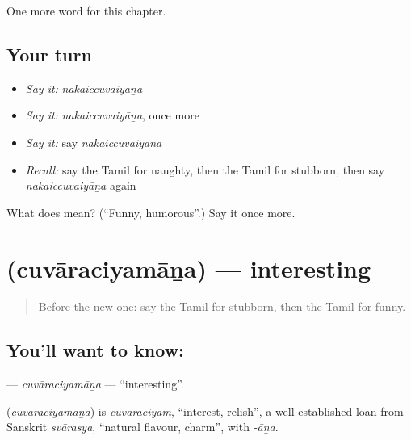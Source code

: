 \begin{grammarlens}[title={What you've built}]
One more word for this chapter.
\end{grammarlens}

\subsection*{Your turn}
\begin{itemize}
\raggedright
  \item \emph{Say it:} \emph{nakaiccuvaiyāṉa}
  \item \emph{Say it:} \emph{nakaiccuvaiyāṉa}, once more
  \item \emph{Say it:} say \emph{nakaiccuvaiyāṉa}
  \item \emph{Recall:} say the Tamil for naughty, then the Tamil for stubborn, then say \emph{nakaiccuvaiyāṉa} again
\end{itemize}

\begin{tcolorbox}[breakable,colback=teal!4,colframe=teal!35!black,title={Before you move on}]
What does  mean? (\textquotedblleft{}Funny, humorous\textquotedblright{}.) Say it once more.
\end{tcolorbox}
\section[\texorpdfstring{\ta{சுவாரசியமான} (cuvāraciyamāṉa)}{சுவாரசியமான (cuvāraciyamāṉa)}]{ (cuvāraciyamāṉa) — interesting}

\label{lesson:TA-C180-cuvaraciyamana}



\begin{quote}
Before the new one: say the Tamil for stubborn, then the Tamil for funny.
\end{quote}

\subsection*{You'll want to know: }
\textbf{} — \emph{cuvāraciyamāṉa} — \textquotedblleft{}interesting\textquotedblright{}.

\begin{cousinweb}
\textbf{} (\emph{cuvāraciyamāṉa}) is \emph{cuvāraciyam}, \textquotedblleft{}interest, relish\textquotedblright{}, a well-established loan from Sanskrit \emph{svārasya}, \textquotedblleft{}natural flavour, charm\textquotedblright{}, with \emph{-āṉa}.
\end{cousinweb}

